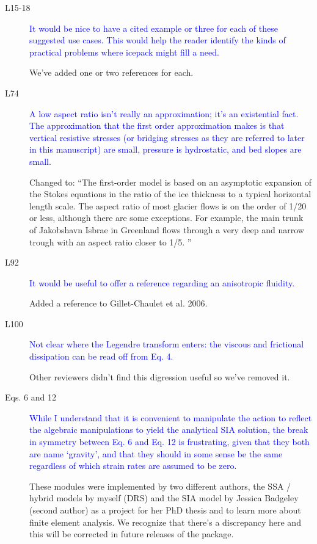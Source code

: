 \documentclass{article}
\theoremstyle{definition}
\theoremstyle{plain}
\begin{document}
\begin{description}
\item[L15-18] \textcolor{blue}{It would be nice to have a cited example or three for each of these
suggested use cases. This would help the reader identify the kinds of
practical problems where icepack might fill a need.}

We've added one or two references for each.

\item[L74] \textcolor{blue}{A low aspect ratio isn't really an approximation; it’s an existential fact.
The approximation that the first order approximation makes is that vertical resistive stresses (or bridging stresses as they are referred to later
in this manuscript) are small, pressure is hydrostatic, and bed slopes are
small.}

Changed to: ``The first-order model is based on an asymptotic expansion of the Stokes equations in the ratio of the ice thickness to a typical horizontal length scale.
The aspect ratio of most glacier flows is on the order of 1/20 or less, although there are some exceptions.
For example, the main trunk of Jakobshavn Isbrae in Greenland flows through a very deep and narrow trough with an aspect ratio closer to 1/5.
''

\item[L92] \textcolor{blue}{It would be useful to offer a reference regarding an anisotropic fluidity.}

Added a reference to Gillet-Chaulet et al. 2006.

\item[L100] \textcolor{blue}{Not clear where the Legendre transform enters: the viscous and frictional
dissipation can be read off from Eq. 4.}

Other reviewers didn't find this digression useful so we've removed it.

\item[Eqs. 6 and 12]\textcolor{blue}{While I understand that it is convenient to manipulate the
action to reflect the algebraic manipulations to yield the analytical SIA
solution, the break in symmetry between Eq. 6 and Eq. 12 is frustrating,
given that they both are name `gravity', and that they should in some
sense be the same regardless of which strain rates are assumed to be zero.}

These modules were implemented by two different authors, the SSA / hybrid models by myself (DRS) and the SIA model by Jessica Badgeley (second author) as a project for her PhD thesis and to learn more about finite element analysis.
We recognize that there's a discrepancy here and this will be corrected in future releases of the package.


\end{description}
\end{document}

